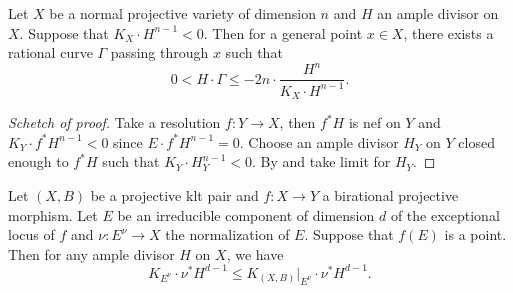 
    \begin{proposition}\label{prop:general_rational_curve_on_klt_variety_with_negative_intersection}
        Let \(X\) be a normal projective variety of dimension \(n\) and \(H\) an ample divisor on \(X\).
        Suppose that \(K_X\cdot H^{n-1} < 0\).
        Then for a general point \(x\in X\), there exists a rational curve \(\Gamma\) passing through \(x\) such that
        \[ 0 < H \cdot \Gamma \leq - 2n \cdot \frac{H^n}{K_X \cdot H^{n-1}}. \]
    \end{proposition}
    \begin{proof}[Schetch of proof]
        Take a resolution \(f:Y \to X\), then \(f^*H\) is nef on \(Y\) and \(K_Y\cdot f^*H^{n-1} < 0\) since \(E \cdot f^*H^{n-1} = 0\).
        Choose an ample divisor \(H_Y\) on \(Y\) closed enough to \(f^*H\) such that \(K_Y \cdot H_Y^{n-1} < 0\).
        By \cite[Theorem 5]{MM86} and take limit for \(H_Y\).
    \end{proof}

    \begin{lemma}\label{lem:the_pair_controls_the_exceptional_locus}
        Let \((X,B)\) be a projective klt pair and \(f:X \to Y\) a birational projective morphism.
        Let \(E\) be an irreducible component of dimension \(d\) of the exceptional locus of \(f\) and \(\nu:E^\nu \to X\) the normalization of \(E\).
        Suppose that \(f(E)\) is a point.
        Then for any ample divisor \(H\) on \(X\), we have
        \[ K_{E^\nu}\cdot \nu^*H^{d-1} \leq K_{(X,B)}|_{E^\nu}\cdot \nu^*H^{d-1}. \]
    \end{lemma}


